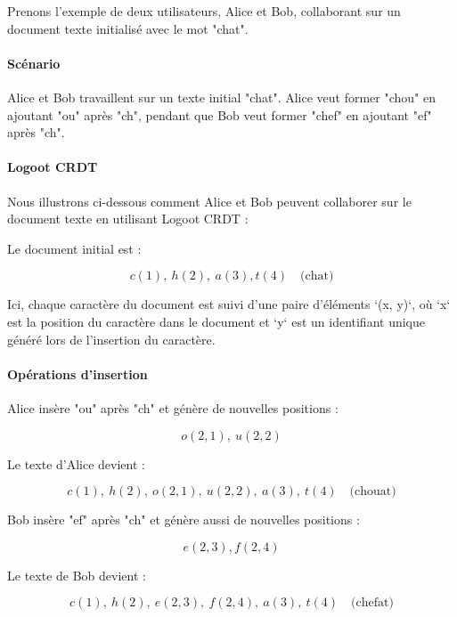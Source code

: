 Prenons l'exemple de deux utilisateurs, Alice et Bob, collaborant sur un document texte initialisé avec le mot "chat".

\paragraph{Scénario}
Alice et Bob travaillent sur un texte initial "chat". Alice veut former "chou" en ajoutant "ou" après "ch", pendant que Bob veut former "chef" en ajoutant "ef" après "ch".

\paragraph{Logoot CRDT}
Nous illustrons ci-dessous comment Alice et Bob peuvent collaborer sur le document texte en utilisant Logoot CRDT :

Le document initial est :

\begin{equation}
    c(1),\ h(2), \ a(3), t(4) \quad \text{(chat)}
\end{equation}

Ici, chaque caractère du document est suivi d'une paire d'éléments `(x, y)`, où `x` est la position du caractère dans le document et `y` est un identifiant unique généré lors de l'insertion du caractère.

\paragraph{Opérations d'insertion}
Alice insère "ou" après "ch" et génère de nouvelles positions :

\begin{equation}
    o(2, 1), \ u(2, 2)
\end{equation}

Le texte d'Alice devient :

\begin{equation}
    c(1), \ h(2), \ o(2, 1), \ u(2, 2), \ a(3), \ t(4) \quad \text{(chouat)}
\end{equation}

Bob insère "ef" après "ch" et génère aussi de nouvelles positions :

\begin{equation}
    e(2, 3), f(2, 4)
\end{equation}

Le texte de Bob devient :

\begin{equation}
    c(1), \ h(2), \ e(2, 3), \ f(2, 4), \ a(3), \ t(4) \quad \text{(chefat)}
\end{equation}

